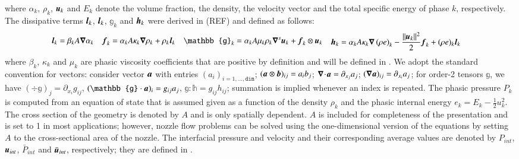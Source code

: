 \documentclass[preprint,10pt]{elsarticle}
\begin{document}
%
where $\alpha_k$, $\rho_k$, $\boldsymbol u_k$ and $E_k$ denote the volume fraction, the density, the velocity vector and the total specific 
energy of phase $k$, respectively. The dissipative terms $\boldsymbol l_k$, $\boldsymbol l_k$, $\mathbb{g}_k$ and $\boldsymbol h_k$ were derived in (REF) and defined as follows: 
%
\begin{subequations}\label{eq:visc-reg-7-equ-sect4}
\begin{align}
  \mbold l_k &= \beta_k A \grad \alpha_k 
\end{align}
\begin{align}
  \mbold f_k &= \alpha_k A \kappa_k \grad \rho_k + \rho_k  \mbold l_k 
\end{align}
\begin{align}
\mathbb{g}_k &= \alpha_k A \mu_k \rho_k \grad^s \mbold u_k + \mbold f_k \otimes \mbold u_k 
\end{align}
\begin{align}
  \mbold h_k &=  \alpha_k A \kappa_k \grad \left( \rho e \right)_k  - \frac{\| \mbold u_k \|^2}{2} \mbold f_k + (\rho e)_k \mbold l_k 
\end{align}
\end{subequations}
%
where $\beta_k$, $\kappa_k$ and $\mu_k$ are phasic viscosity coefficients that are positive by definition and will be defined in .
We adopt the standard convention for vectors: consider vector $\boldsymbol a$ with entries $(a_i)_{i=1,\ldots,\texttt{dim}}$; $(\boldsymbol a \otimes \boldsymbol b)_{ij}=a_i b_j$;
$\boldsymbol\nabla\! \cdot \! \boldsymbol a= \partial_{x_j} a_j$; $(\boldsymbol\nabla \boldsymbol a)_{ij} = \partial_{x_i} a_j$; for order-2 tensors $\mathbb{g}$, 
we have $(\div \mathbb{g})_j = \partial_{x_i} g_{ij}$, $(\mathbb{g}\cdot \mbold{a})_i = g_{ij}a_j$, 
$\mathbb{g}:\mathbb{h} = g_{ij} h_{ij}$; summation is implied whenever an index is repeated. 
The phasic pressure $P_k$ is computed from an equation of state that is assumed given as a function of the density $\rho_k$ and 
the phasic internal energy $e_k = E_k - \tfrac{1}{2} u^2_k$. The cross section of the geometry is denoted by $A$ and is only 
spatially dependent. $A$ is included for completeness of the presentation and is set to 1 in most applications; however, 
nozzle flow problems can be solved using the one-dimensional version of the equations by setting $A$ to the cross-sectional area 
of the nozzle. The interfacial pressure and velocity and their corresponding average values are denoted by $P_{int}$, $\boldsymbol u_{int}$, 
$\bar{P}_{int}$ and $\bar{\boldsymbol u}_{int}$, respectively; they are defined in .
\end{document}
